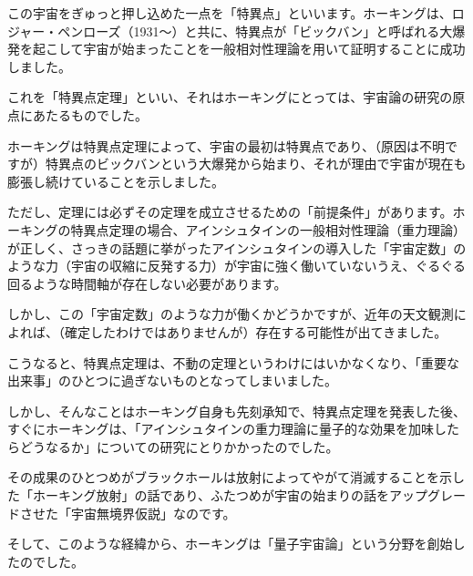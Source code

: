 \documentclass[10pt,b5paper,papersize,dvipdfmx]{jsbook}
\begin{document}
この宇宙をぎゅっと押し込めた一点を「特異点」といいます。ホーキングは、ロジャー・ペンローズ（1931～）と共に、特異点が「ビックバン」と呼ばれる大爆発を起こして宇宙が始まったことを一般相対性理論を用いて証明することに成功しました。\par
これを「特異点定理」といい、それはホーキングにとっては、宇宙論の研究の原点にあたるものでした。\par
ホーキングは特異点定理によって、宇宙の最初は特異点であり、（原因は不明ですが）特異点のビックバンという大爆発から始まり、それが理由で宇宙が現在も膨張し続けていることを示しました。\par
ただし、定理には必ずその定理を成立させるための「前提条件」があります。ホーキングの特異点定理の場合、アインシュタインの一般相対性理論（重力理論）が正しく、さっきの話題に挙がったアインシュタインの導入した「宇宙定数」のような力（宇宙の収縮に反発する力）が宇宙に強く働いていないうえ、ぐるぐる回るような時間軸が存在しない必要があります。\par
しかし、この「宇宙定数」のような力が働くかどうかですが、近年の天文観測によれば、（確定したわけではありませんが）存在する可能性が出てきました。\par
こうなると、特異点定理は、不動の定理というわけにはいかなくなり、「重要な出来事」のひとつに過ぎないものとなってしまいました。\par
しかし、そんなことはホーキング自身も先刻承知で、特異点定理を発表した後、すぐにホーキングは、「アインシュタインの重力理論に量子的な効果を加味したらどうなるか」についての研究にとりかかったのでした。\par
その成果のひとつめがブラックホールは放射によってやがて消滅することを示した「ホーキング放射」の話であり、ふたつめが宇宙の始まりの話をアップグレードさせた「宇宙無境界仮説」なのです。\par
そして、このような経緯から、ホーキングは「量子宇宙論」という分野を創始したのでした。\par
\end{document}
